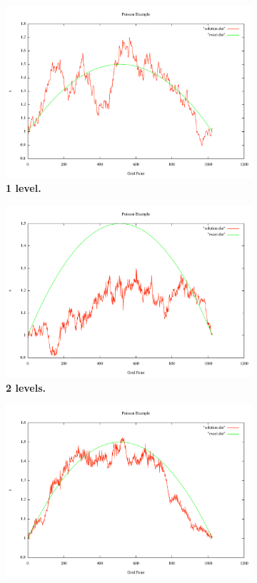 \documentclass[note]{TechNote}
\begin{document}
\begin{figure}[h!]
  \centering
  \begin{subfigure}[b]{0.32\textwidth}
    \includegraphics[width=\textwidth]{7_sec_1_level.pdf}
    \caption{\textbf{1 level.}}
  \end{subfigure}
  \begin{subfigure}[b]{0.32\textwidth}
    \includegraphics[width=\textwidth]{7_sec_2_level.pdf}
    \caption{\textbf{2 levels.}}
  \end{subfigure}
  \begin{subfigure}[b]{0.32\textwidth}
    \includegraphics[width=\textwidth]{7_sec_3_level.pdf}

\end{subfigure}
\end{figure}
\end{document}

